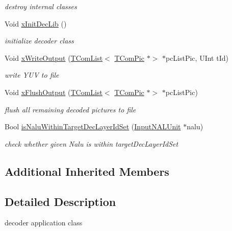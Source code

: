 \begin{DoxyCompactItemize}
\begin{DoxyCompactList}\small\item\em destroy internal classes \end{DoxyCompactList}\item 
\mbox{\label{class_t_app_dec_top_a99c7548a887e8f900ff9ac518cf58bdd}} 
Void \hyperlink{class_t_app_dec_top_a99c7548a887e8f900ff9ac518cf58bdd}{x\+Init\+Dec\+Lib} ()
\begin{DoxyCompactList}\small\item\em initialize decoder class \end{DoxyCompactList}\item 
Void \hyperlink{class_t_app_dec_top_af61c9ec5e471d49cf979288e60d8c65e}{x\+Write\+Output} (\hyperlink{class_t_com_list}{T\+Com\+List}$<$ \hyperlink{class_t_com_pic}{T\+Com\+Pic} $\ast$$>$ $\ast$pc\+List\+Pic, U\+Int t\+Id)
\begin{DoxyCompactList}\small\item\em write Y\+UV to file \end{DoxyCompactList}\item 
Void \hyperlink{class_t_app_dec_top_abc0fd7b3dce420f7f6adc78b434087c2}{x\+Flush\+Output} (\hyperlink{class_t_com_list}{T\+Com\+List}$<$ \hyperlink{class_t_com_pic}{T\+Com\+Pic} $\ast$$>$ $\ast$pc\+List\+Pic)
\begin{DoxyCompactList}\small\item\em flush all remaining decoded pictures to file \end{DoxyCompactList}\item 
Bool \hyperlink{class_t_app_dec_top_abd617b847de5611ff3d355ddbf580690}{is\+Nalu\+Within\+Target\+Dec\+Layer\+Id\+Set} (\hyperlink{class_input_n_a_l_unit}{Input\+N\+A\+L\+Unit} $\ast$nalu)
\begin{DoxyCompactList}\small\item\em check whether given Nalu is within target\+Dec\+Layer\+Id\+Set \end{DoxyCompactList}\end{DoxyCompactItemize}
\subsection*{Additional Inherited Members}


\subsection{Detailed Description}
decoder application class 

